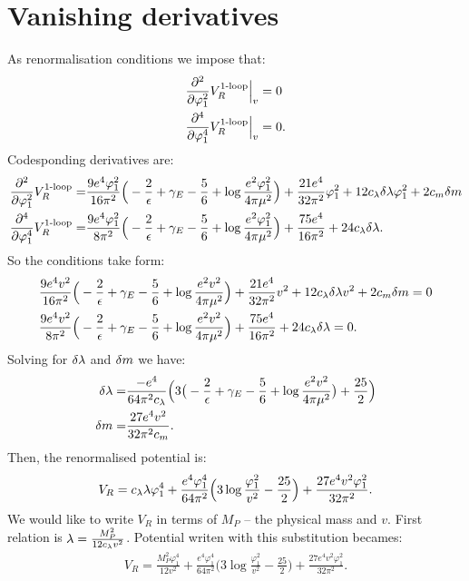 \section{Vanishing derivatives}
As renormalisation conditions we impose that:
\begin{align}
\frac{\partial^2 }{\partial \varphi_1^2}V_R^{\textrm{1-loop}}\Big|_{v} &= 0 \\
\frac{\partial^4 }{\partial \varphi_1^4}V_R^{\textrm{1-loop}}\Big|_{v} &= 0.
\end{align}
Codesponding derivatives are:
\begin{align}
\frac{\partial^2 }{\partial \varphi_1^2}V_R^{\textrm{1-loop}} = &\frac{9e^4\varphi_1^2}{16\pi^2}\Big(-\frac{2}{\epsilon}+\gamma_E-
\frac{5}{6}+\log{\frac{e^2\varphi_1^2}{4\pi\mu^2}}\Big)+\frac{21e^4}{32\pi^2}\varphi_1^2+ 
12c_\lambda\delta\lambda\varphi_1^2+2c_m\delta m \\
\frac{\partial^4 }{\partial \varphi_1^4}V_R^{\textrm{1-loop}} = &\frac{9e^4\varphi_1^2}{8\pi^2}\Big(-\frac{2}{\epsilon}+\gamma_E-
\frac{5}{6}+\log{\frac{e^2\varphi_1^2}{4\pi\mu^2}}\Big)+\frac{75e^4}{16\pi^2}+24c_\lambda\delta\lambda.
\end{align}
So the conditions take form:
\begin{align}
&\frac{9e^4v^2}{16\pi^2}\Big(-\frac{2}{\epsilon}+\gamma_E-
\frac{5}{6}+\log{\frac{e^2v^2}{4\pi\mu^2}}\Big)+\frac{21e^4}{32\pi^2}v^2+ 
12c_\lambda\delta\lambda v^2+2c_m\delta m = 0\\
&\frac{9e^4v^2}{8\pi^2}\Big(-\frac{2}{\epsilon}+\gamma_E-
\frac{5}{6}+\log{\frac{e^2v^2}{4\pi\mu^2}}\Big)+\frac{75e^4}{16\pi^2}+24c_\lambda\delta\lambda = 0.
\end{align}
Solving for $\delta\lambda$ and $\delta m$ we have:
\begin{align}
\delta\lambda = &\frac{-e^4}{64\pi^2c_\lambda}\Big(3\big(-\frac{2}{\epsilon}+\gamma_E-
\frac{5}{6}+\log\frac{e^2v^2}{4\pi\mu^2}\big)+\frac{25}{2}\Big) \\
\delta m = &\frac{27e^4v^2}{32\pi^2c_m}.
\end{align}
Then, the renormalised potential is:
\begin{align}
V_R = c_\lambda\lambda\varphi_1^4 + \frac{e^4\varphi_1^4}{64\pi^2}\Big(3\log\frac{\varphi_1^2}{v^2}- 
\frac{25}{2}\Big)+
\frac{27e^4v^2\varphi_1^2}{32\pi^2}.
\end{align}
We would like to write $V_R$ in terms of $M_P$ -- the physical mass and $v$.
First relation is $\lambda = \frac{M_P^2}{12c_\lambda v^2}$. Potential writen with this substitution 
becames:
\begin{align}
V_R = \frac{M_P^2\varphi_1^4}{12v^2} + \frac{e^4\varphi_1^4}{64\pi^2}\Big(3\log
\frac{\varphi_1^2}{v^2}- 
\frac{25}{2}\Big)+
\frac{27e^4v^2\varphi_1^2}{32\pi^2}.
\end{align}
